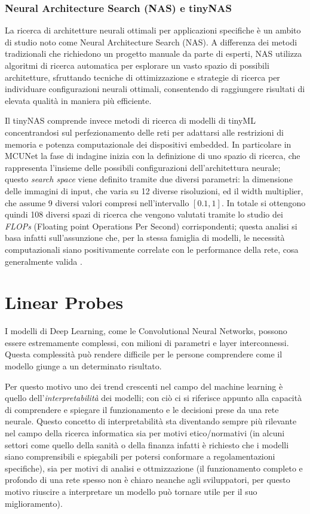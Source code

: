\subsubsection{Neural Architecture Search (NAS) e tinyNAS}

La ricerca di architetture neurali ottimali per applicazioni specifiche è un ambito di studio noto come Neural Architecture Search (NAS). A differenza dei metodi tradizionali che richiedono un progetto manuale da parte di esperti, NAS utilizza algoritmi di ricerca automatica per esplorare un vasto spazio di possibili architetture, sfruttando tecniche di ottimizzazione e strategie di ricerca per individuare configurazioni neurali ottimali, consentendo di raggiungere risultati di elevata qualità in maniera più efficiente.

Il tinyNAS comprende invece metodi di ricerca di modelli di tinyML concentrandosi sul perfezionamento delle reti per adattarsi alle restrizioni di memoria e potenza computazionale dei dispositivi embedded.
In particolare in MCUNet la fase di indagine inizia con la definizione di uno spazio di ricerca, che rappresenta l'insieme delle possibili configurazioni dell'architettura neurale; questo \textit{search space} viene definito tramite due diversi parametri: la dimensione delle immagini di input, che varia su 12 diverse risoluzioni, ed il width multiplier, che assume 9 diversi valori compresi nell'intervallo $[0.1, 1]$. In totale si ottengono quindi 108 diversi spazi di ricerca che vengono valutati tramite lo studio dei \textit{FLOPs} (Floating point Operations Per Second) corrispondenti; questa analisi si basa infatti sull'assunzione che, per la stessa famiglia di modelli, le necessità computazionali siano positivamente correlate con le performance della rete, cosa generalmente valida \cite{EfficientNet}. 

\section{Linear Probes}
\label{sec:probes}

I modelli di Deep Learning, come le Convolutional Neural Networks, possono essere estremamente complessi, con milioni di parametri e layer interconnessi. Questa complessità può rendere difficile per le persone comprendere come il modello giunge a un determinato risultato.

Per questo motivo uno dei trend crescenti nel campo del machine learning è quello dell'\textit{interpretabilità} dei modelli; con ciò ci si riferisce appunto alla capacità di comprendere e spiegare il funzionamento e le decisioni prese da una rete neurale. Questo concetto di interpretabilità sta diventando sempre più rilevante nel campo della ricerca informatica sia per motivi etico/normativi (in alcuni settori come quello della sanità o della finanza infatti è richiesto che i modelli siano comprensibili e spiegabili per potersi conformare a regolamentazioni specifiche), sia per motivi di analisi e ottmizzazione (il funzionamento completo e profondo di una rete spesso non è chiaro neanche agli sviluppatori, per questo motivo riuscire a interpretare un modello può tornare utile per il suo miglioramento).

